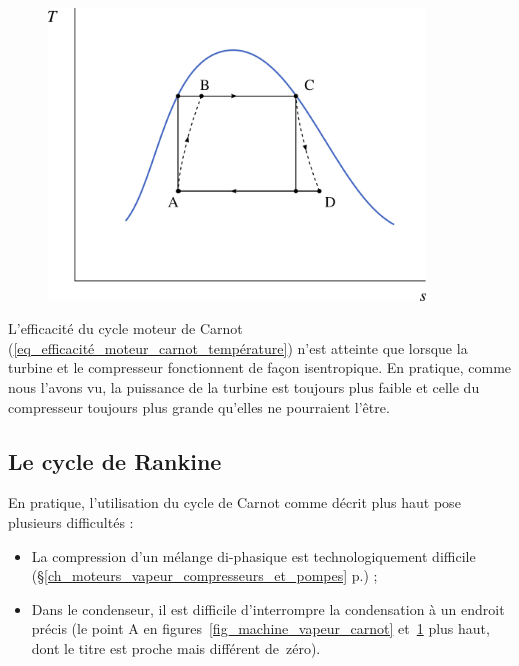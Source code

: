 		\begin{figure}
			\begin{center}
				\includegraphics[width=10cm]{images/ts_lv_carnot.png}
			\end{center}
			\label{fig_ts_machine_vapeur_carnot}
		\end{figure}

		L’efficacité du cycle moteur de Carnot (\ref{eq_efficacité_moteur_carnot_température}) n’est atteinte que lorsque la turbine et le compresseur fonctionnent de façon isentropique. En pratique, comme nous l’avons vu, la puissance de la turbine est toujours plus faible et celle du compresseur toujours plus grande qu’elles ne pourraient l’être.


	\subsection{Le cycle de Rankine}
	\label{ch_cycle_de_rankine}

		En pratique, l’utilisation du cycle de Carnot comme décrit plus haut pose plusieurs \mbox{difficultés} :

		\begin{itemize}
			\item La compression d’un mélange di-phasique est technologiquement difficile (\S\ref{ch_moteurs_vapeur_compresseurs_et_pompes} p.\pageref{ch_moteurs_vapeur_compresseurs_et_pompes}) ;
			\item Dans le condenseur, il est difficile d’interrompre la condensation à un endroit précis (le point A en figures~\ref{fig_machine_vapeur_carnot} et~\ref{fig_ts_machine_vapeur_carnot} plus haut, dont le titre est proche mais différent de~zéro).
		\end{itemize}


